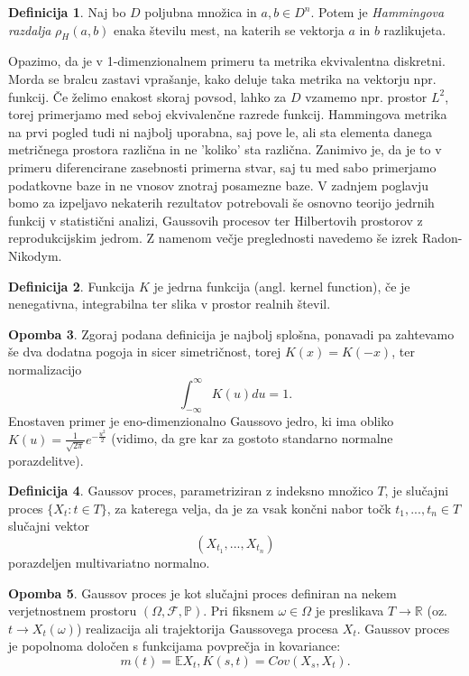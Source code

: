 \documentclass[12pt,a4paper]{amsart}
\theoremstyle{definition} %
\newtheorem{definicija}{Definicija}[section]
\newtheorem{opomba}[definicija]{Opomba}
\theoremstyle{plain} %
\begin{document}
\begin{definicija}
Naj bo $D$ poljubna množica in $a , b \in D^n$. Potem je  \textit{Hammingova razdalja} $\rho_H(a,b)$ enaka številu mest, na katerih se vektorja $a$ in $b$ razlikujeta.
\end{definicija}
Opazimo, da je v 1-dimenzionalnem primeru  ta metrika ekvivalentna diskretni. Morda se bralcu zastavi vprašanje, kako deluje taka metrika na vektorju npr. funkcij. Če želimo enakost skoraj povsod, lahko za $D$ vzamemo npr. prostor $L^2$, torej primerjamo med seboj ekvivalenčne razrede funkcij.  Hammingova metrika na prvi pogled tudi ni najbolj uporabna, saj pove le, ali sta elementa danega metričnega prostora različna in ne 'koliko' sta različna. Zanimivo je, da je to v primeru diferencirane zasebnosti primerna stvar, saj tu med sabo primerjamo podatkovne baze in ne vnosov znotraj posamezne baze. 
\newline
\newline
V zadnjem poglavju bomo za izpeljavo nekaterih rezultatov potrebovali še osnovno teorijo jedrnih funkcij v statistični analizi, Gaussovih procesov ter Hilbertovih prostorov z reprodukcijskim jedrom. Z namenom večje preglednosti navedemo še izrek Radon-Nikodym.
\begin{definicija}
Funkcija $K$ je jedrna funkcija (angl. kernel function), če je nenegativna, integrabilna ter slika v prostor realnih števil.
\end{definicija}
\begin{opomba}
Zgoraj podana definicija je najbolj splošna, ponavadi pa zahtevamo še dva dodatna pogoja in sicer simetričnost, torej $K(x) = K(-x)$, ter normalizacijo
$$
\int_{-\infty}^{\infty} K(u)du=1.
$$
Enostaven primer je eno-dimenzionalno Gaussovo jedro, ki ima obliko $K(u)=\frac{1}{\sqrt{2\pi}}e^{-\frac{u^2}{2}}$ (vidimo, da gre kar za gostoto standarno normalne porazdelitve).
\end{opomba}
\begin{definicija}
Gaussov proces, parametriziran z indeksno množico $T$, je slučajni proces $\{X_t : t \in T\}$, za katerega velja, da je za vsak končni nabor točk $t_1,...,t_n \in T$ slučajni vektor
$$
(X_{t_1},...,X_{t_n})
$$
porazdeljen multivariatno normalno.
\end{definicija}
\begin{opomba}
Gaussov proces je kot slučajni proces definiran na nekem verjetnostnem prostoru  $(\Omega, \mathcal{F}, \mathbb{P})$. Pri fiksnem $\omega \in \Omega$ je preslikava $T \rightarrow \mathbb{R}$ (oz. $t \rightarrow X_t(\omega)$) realizacija ali trajektorija Gaussovega procesa $X_t$. Gaussov proces je popolnoma določen s funkcijama povprečja  in kovariance: 
$$m(t) = \mathbb{E}X_t, K(s,t) = Cov(X_s,X_t).$$
\end{opomba}
\end{document}
